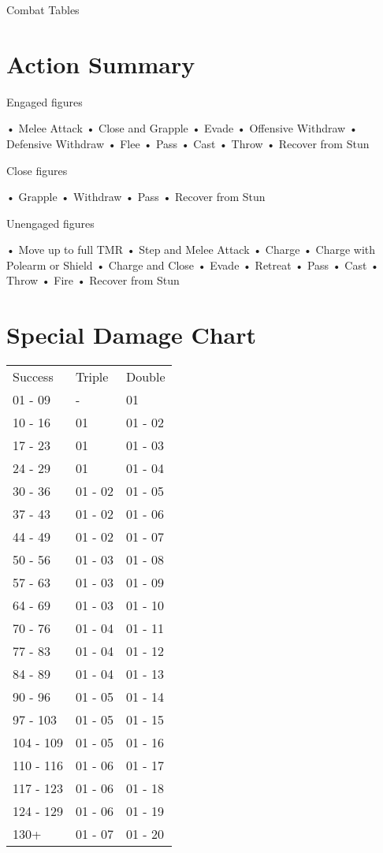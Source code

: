 \begin{Table}{Combat Tables}
\begin{multicols}{3}

\section{Action Summary}

Engaged figures  

• Melee Attack  
• Close and Grapple  
• Evade  
• Offensive Withdraw  
• Defensive Withdraw  
• Flee  
• Pass  
• Cast  
• Throw  
• Recover from Stun 

Close figures  

• Grapple  
• Withdraw  
• Pass  
• Recover from Stun 

Unengaged figures  

• Move up to full TMR  
• Step and Melee Attack  
• Charge  
• Charge with Polearm or Shield  
• Charge and Close  
• Evade  
• Retreat  
• Pass  
• Cast  
• Throw  
• Fire  
• Recover from Stun 
 

\section{Special Damage Chart}

\begin{tabularx}{\columnwidth}{XXX}
Success		& Triple	& Double \\
01 - 09		& -		& 01 \\
10 - 16		& 01		& 01 - 02 \\
17 - 23		& 01		& 01 - 03 \\
24 - 29		& 01		& 01 - 04 \\
30 - 36		& 01 - 02	& 01 - 05 \\
37 - 43		& 01 - 02	& 01 - 06 \\
44 - 49		& 01 - 02	& 01 - 07 \\
50 - 56		& 01 - 03	& 01 - 08 \\
57 - 63		& 01 - 03	& 01 - 09 \\
64 - 69		& 01 - 03	& 01 - 10 \\
70 - 76		& 01 - 04	& 01 - 11 \\
77 - 83		& 01 - 04	& 01 - 12 \\
84 - 89		& 01 - 04	& 01 - 13 \\
90 - 96		& 01 - 05	& 01 - 14 \\
97 - 103	& 01 - 05	& 01 - 15 \\
104 - 109	& 01 - 05	& 01 - 16 \\
110 - 116	& 01 - 06	& 01 - 17 \\
117 - 123	& 01 - 06	& 01 - 18 \\
124 - 129	& 01 - 06	& 01 - 19 \\
130+		& 01 - 07	& 01 - 20 \\
\end{tabularx}
\end{multicols}
\end{Table}

